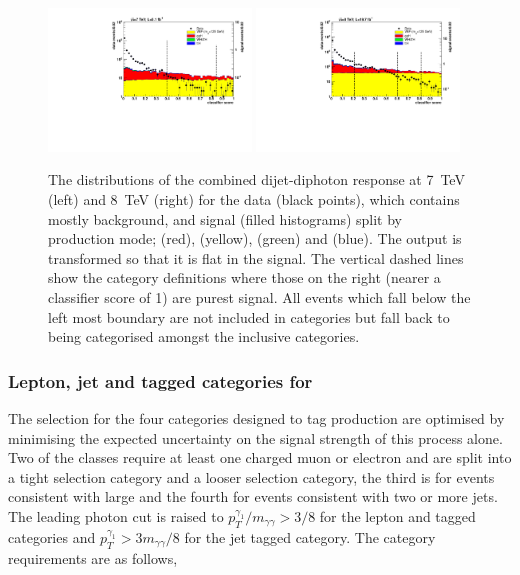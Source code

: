 \begin{figure}
  \includegraphics[width=0.48\textwidth]{selec_and_cats/plots/mixedcombbdt_transformed_7TeV_fix.pdf}
  \includegraphics[width=0.48\textwidth]{selec_and_cats/plots/mixedcombbdt_transformed_8TeV_fix.pdf}
  \caption[The distribution of the combined dijet-diphoton \BDT response]{The distributions of the combined dijet-diphoton \BDT response at 7~TeV (left) and 8~TeV (right) for the data (black points), which contains mostly background, and signal (filled histograms) split by production mode; \ggH (red), \VBF (yellow), \VH (green) and \ttH (blue). The output is transformed so that it is flat in the \VBF signal. The vertical dashed lines show the \VBF category definitions where those on the right (nearer a classifier score of 1) are purest \VBF signal. All events which fall below the left most boundary are not included in \VBF categories but fall back to being categorised amongst the inclusive categories.}
  \label{fig:vbf_dijet_comb}
\end{figure}

\subsubsection{Lepton, jet and \MET tagged categories for \VH}
\label{sec:vh_tag}

The selection for the four categories designed to tag \VH production are optimised by minimising the expected uncertainty on the signal strength of this process alone. Two of the classes require at least one charged muon or electron and are split into a tight selection category and a looser selection category, the third is for events consistent with large \MET and the fourth for events consistent with two or more jets. The leading photon cut is raised to $p_{T}^{\gamma_{1}}/m_{\gamma\gamma}>3/8$ for the lepton and \MET tagged categories and $p_{T}^{\gamma_{1}}>3m_{\gamma\gamma}/8$ for the jet tagged category. The category requirements are as follows,

